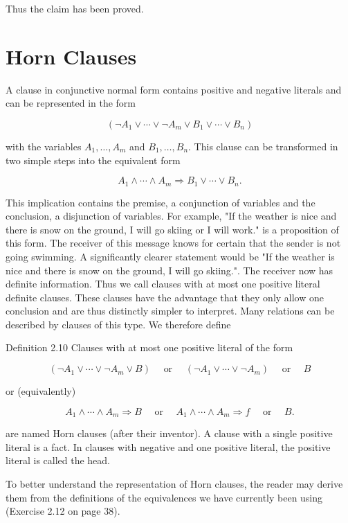 \documentclass[10pt]{book}
\begin{document}
Thus the claim has been proved.

\section{Horn Clauses}
A clause in conjunctive normal form contains positive and negative literals and can be represented in the form

$$
\left(\neg A_{1} \vee \cdots \vee \neg A_{m} \vee B_{1} \vee \cdots \vee B_{n}\right)
$$

with the variables $A_{1}, \ldots, A_{m}$ and $B_{1}, \ldots, B_{n}$. This clause can be transformed in two simple steps into the equivalent form

$$
A_{1} \wedge \cdots \wedge A_{m} \Rightarrow B_{1} \vee \cdots \vee B_{n} .
$$

This implication contains the premise, a conjunction of variables and the conclusion, a disjunction of variables. For example, "If the weather is nice and there is snow on the ground, I will go skiing or I will work." is a proposition of this form. The receiver of this message knows for certain that the sender is not going swimming. A significantly clearer statement would be "If the weather is nice and there is snow on the ground, I will go skiing.". The receiver now has definite information. Thus we call clauses with at most one positive literal definite clauses. These clauses have the advantage that they only allow one conclusion and are thus distinctly simpler to interpret. Many relations can be described by clauses of this type. We therefore define

Definition 2.10 Clauses with at most one positive literal of the form

$$
\left(\neg A_{1} \vee \cdots \vee \neg A_{m} \vee B\right) \quad \text { or } \quad\left(\neg A_{1} \vee \cdots \vee \neg A_{m}\right) \quad \text { or } \quad B
$$

or (equivalently)

$$
A_{1} \wedge \cdots \wedge A_{m} \Rightarrow B \quad \text { or } \quad A_{1} \wedge \cdots \wedge A_{m} \Rightarrow f \quad \text { or } \quad B .
$$

are named Horn clauses (after their inventor). A clause with a single positive literal is a fact. In clauses with negative and one positive literal, the positive literal is called the head.

To better understand the representation of Horn clauses, the reader may derive them from the definitions of the equivalences we have currently been using (Exercise 2.12 on page 38).
\end{document}
